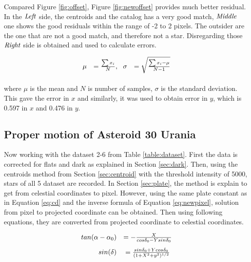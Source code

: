 \documentclass[a4paper,12pt]{article}
\begin{document}
Compared Figure \ref{fig:offset}, Figure \ref{fig:newoffset} provides much better residual. In the $\it{Left}$ side, the centroids and the catalog has a very good match, $\it{Middle}$ one shows the good residuals within the range of -2 to 2 pixels. The outsider are the one that are not a good match, and therefore not a star. Disregarding those  $\it{Right}$ side is obtained and used to calculate errors. 

\begin{equation}
\label{eq:SD}
\begin{array}{rcl}
	\vspace{0.3cm}
	\mu &= \frac{\sum x_i}{N}, \ \
	\sigma &= \sqrt{\frac{\sum x_i - \mu}{N-1}}
\end{array}
\end{equation}
where $\mu$ is the mean and $N$ is number of samples, $\sigma$ is the standard deviation. This gave the error in $x$ and similarly, it was used to obtain error in $y$, which is 0.597 in $x$ and 0.476 in $y$. 

\subsection{Proper motion of Asteroid 30 Urania}
\label{sec:proper}
Now working with the dataset 2-6 from Table \ref{table:dataset}. First the data is corrected for flats and dark as explained in Section \ref{sec:dark}. Then, using the centroids method from Section \ref{sec:centroid} with the threshold intensity of 5000, stars of all 5 dataset are recorded. In Section \ref{sec:plate}, the method is explain to get from celestial coordinates to pixel. However, using the same plate constant as in Equation \ref{eq:cd} and the inverse formula of Equation \ref{eq:newpixel}, solution from pixel to projected coordinate can be obtained. Then using following equations, they are converted from projected coordinate to celestial coordinates.

\begin{equation}
\label{eq:angle}
\begin{array}{rcl}
   \vspace{0.3cm}
   tan(\alpha-\alpha_0) &= -\frac{X}{cos\delta_0 -Ysin\delta_0}\\
   sin(\delta) &= \frac{sin\delta_0+Ycos\delta_0}{(1+X^2+y^2)^{1/2}} 
\end{array}
\end{equation}
\end{document}
